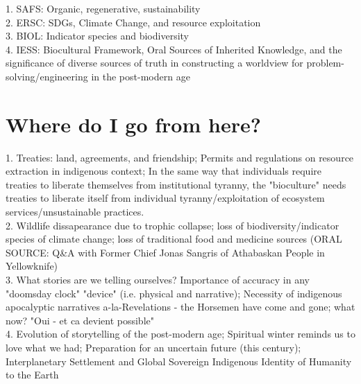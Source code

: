 \documentclass{report}
\begin{document}
1. SAFS: Organic, regenerative, sustainability\\
2. ERSC: SDGs, Climate Change, and resource exploitation\\
3. BIOL: Indicator species and biodiversity\\
4. IESS: Biocultural Framework, Oral Sources of Inherited Knowledge, and the significance of diverse sources of truth in constructing a worldview for problem-solving/engineering in the post-modern age

\section{Where do I go from here?}

1. Treaties: land, agreements, and friendship; Permits and regulations on resource extraction in indigenous context; In the same way that individuals require treaties to liberate themselves from institutional tyranny, the "bioculture" needs treaties to liberate itself from individual tyranny/exploitation of ecosystem services/unsustainable practices.\\
2. Wildlife dissapearance due to trophic collapse; loss of biodiversity/indicator species of climate change; loss of traditional food and medicine sources (ORAL SOURCE: Q\&A with Former Chief Jonas Sangris of Athabaskan People in Yellowknife)\\
3. What stories are we telling ourselves? Importance of accuracy in any "doomsday clock" "device" (i.e. physical and narrative); Necessity of indigenous apocalyptic narratives a-la-Revelations - the Horsemen have come and gone; what now? "Oui - et ca devient possible"\\
4. Evolution of storytelling of the post-modern age; Spiritual winter reminds us to love what we had; Preparation for an uncertain future (this century); Interplanetary Settlement and Global Sovereign Indigenous Identity of Humanity to the Earth

\clearpage

\end{document}
